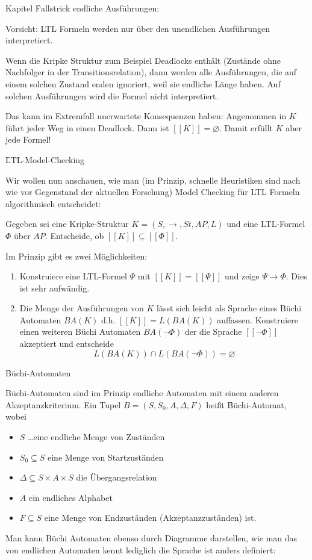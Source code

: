 \begin{chapter}{Kapitel}
\f{Fallstrick endliche Ausführungen}:
\vspace*{4pt}

\noindent Vorsicht: LTL Formeln werden nur über den unendlichen Ausführungen interpretiert.
\vspace*{4pt}

\noindent Wenn die Kripke Struktur zum Beispiel Deadlocks enthält (Zustände ohne Nachfolger in der Transitionsrelation), dann werden alle Ausführungen, die auf 
einem solchen Zustand enden ignoriert, weil sie endliche Länge haben. Auf solchen Ausführungen wird die Formel nicht interpretiert.
\vspace*{4pt}

\noindent Das kann im Extremfall unerwartete Konsequenzen haben: Angenommen in $K$ führt jeder Weg in einen Deadlock. Dann ist $[[K]] = \varnothing$. Damit 
erfüllt $K$ aber jede Formel!
\vspace*{6pt}

\f{LTL-Model-Checking}
\vspace*{4pt}

\noindent Wir wollen nun anschauen, wie man (im Prinzip, schnelle Heuristiken sind nach wie vor Gegenstand der aktuellen Forschung) Model Checking für LTL Formeln 
algorithmisch entscheidet:

\noindent Gegeben sei eine Kripke-Struktur $K=(S,\rightarrow, St,AP,L)$ und eine LTL-Formel $\Phi$ über $AP$. Entscheide, ob $[[K]] \subseteq [[\Phi]]$.

\noindent Im Prinzip gibt es zwei Möglichkeiten: 
\begin{enumerate}
 \item Konstruiere eine LTL-Formel $\Psi$ mit $[[K]] = [[\Psi]]$ und zeige $\Psi \rightarrow \Phi$. Dies ist sehr aufwändig.
 \item Die Menge der Ausführungen von $K$ lässt sich leicht als Sprache eines Büchi Automaten $BA(K)$ d.h. $[[K]] = L(BA(K))$ auffassen. Konstruiere einen weiteren 
 Büchi Automaten $BA(\neg \Phi)$ der die Sprache $[[\neg\Phi]]$ akzeptiert und entscheide \[L(BA(K)) \cap L(BA(\neg\Phi)) = \varnothing\]
\end{enumerate}

\f{Büchi-Automaten}
\vspace*{4pt}

\noindent Büchi-Automaten sind im Prinzip endliche Automaten mit einem anderen Akzeptanzkriterium. Ein Tupel $B=(S,S_0,A,\Delta,F)$ heißt \f{Büchi-Automat}, 
wobei
\begin{itemize}
 \item $S$ \dots eine endliche Menge von Zuständen 
 \item $S_0 \subseteq S$ eine Menge von Startzuständen 
 \item $\Delta \subseteq S\times A \times S$ die Übergangsrelation
 \item $A$ ein endliches Alphabet
 \item $F \subseteq S$ eine Menge von Endzuständen (Akzeptanzzuständen) ist.
\end{itemize}
Man kann Büchi Automaten ebenso durch Diagramme darstellen, wie man das von endlichen Automaten kennt lediglich die Sprache ist anders definiert:


\end{chapter}
